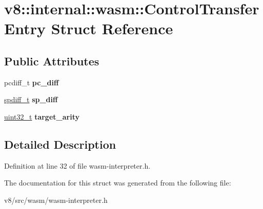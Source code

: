 \hypertarget{structv8_1_1internal_1_1wasm_1_1ControlTransferEntry}{}\section{v8\+:\+:internal\+:\+:wasm\+:\+:Control\+Transfer\+Entry Struct Reference}
\label{structv8_1_1internal_1_1wasm_1_1ControlTransferEntry}
\subsection*{Public Attributes}
\begin{DoxyCompactItemize}
\item 
\mbox{\label{structv8_1_1internal_1_1wasm_1_1ControlTransferEntry_aa9a804d3c4265b32e0ed772ee09ce8dc}} 
pcdiff\+\_\+t {\bfseries pc\+\_\+diff}
\item 
\mbox{\label{structv8_1_1internal_1_1wasm_1_1ControlTransferEntry_a865520ca8350db6f04e5003900370b02}} 
\mbox{\hyperlink{classuint32__t}{spdiff\+\_\+t}} {\bfseries sp\+\_\+diff}
\item 
\mbox{\label{structv8_1_1internal_1_1wasm_1_1ControlTransferEntry_a96ca889c31ad3483dea7ec34e2e190ac}} 
\mbox{\hyperlink{classuint32__t}{uint32\+\_\+t}} {\bfseries target\+\_\+arity}
\end{DoxyCompactItemize}


\subsection{Detailed Description}


Definition at line 32 of file wasm-\/interpreter.\+h.



The documentation for this struct was generated from the following file\+:\begin{DoxyCompactItemize}
\item 
v8/src/wasm/wasm-\/interpreter.\+h\end{DoxyCompactItemize}
